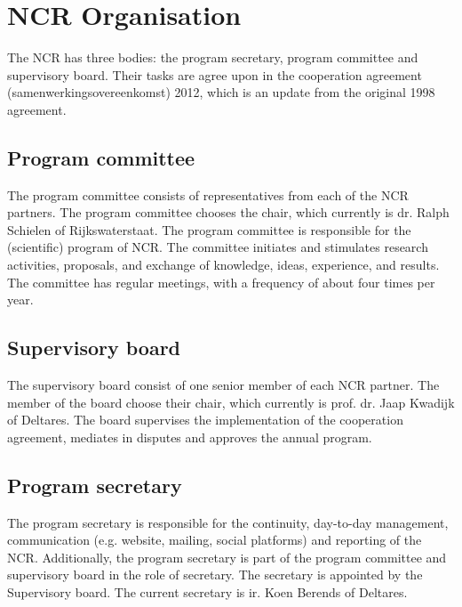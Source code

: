 \chapter{NCR Organisation}
	The NCR has three bodies: the program secretary, program committee and supervisory board. Their tasks are agree upon in the cooperation agreement (samenwerkingsovereenkomst) 2012, which is an update from the original 1998 agreement. 
    
    \section{Program committee}
    The program committee consists of representatives from each of the NCR partners. The program committee chooses the chair, which currently is dr. Ralph Schielen of Rijkswaterstaat. The program committee is responsible for the (scientific) program of NCR. The committee initiates and stimulates research activities, proposals, and exchange of knowledge, ideas, experience, and results. The committee has regular meetings, with a frequency of about four times per year. 
    
    \section{Supervisory board}
    The supervisory board consist of one senior member of each NCR partner. The member of the board choose their chair, which currently is prof. dr. Jaap Kwadijk of Deltares. The board supervises the implementation of the cooperation agreement, mediates in disputes and approves the annual program. 
    
    \section{Program secretary}
    The program secretary is responsible for the continuity,  day-to-day management, communication (e.g. website, mailing, social platforms) and reporting of the NCR. Additionally, the program secretary is part of the program committee and supervisory board in the role of secretary. The secretary is appointed by the Supervisory board. The current secretary is ir. Koen Berends of Deltares. 

